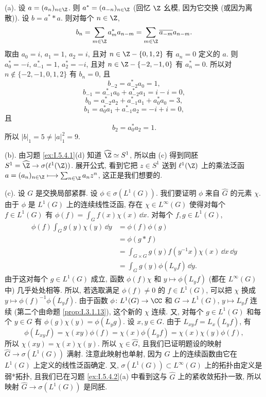 \begin{solution}
(a). 设 $a = (a_n)_{n \in \Z}$. 则 $a^* = (a_{-n})_{n \in \Z}$ (回忆 $\Z$ 幺模, 因为它交换 (或因为离散)). 设 $b = a^* * a$. 则对每个 $n \in \Z$,
\[
b_n = \sum_{m \in \Z}a^*_ma_{n-m} = \sum_{m \in \Z}\overline{a_{-m}}a_{n-m}.
\]
取由 $a_0 = i$, $a_1 = 1$, $a_2 = i$, 且对 $n \in \Z - \{0, 1, 2\}$ 有 $a_n = 0$ 定义的 $a$. 则 $a^*_0 = -i$, $a^*_{-1} = 1$, $a^*_2 = -i$, 且对 $n \in \Z - \{-2, -1, 0\}$ 有 $a^*_n = 0$. 所以对 $n \notin \{-2, -1, 0, 1, 2\}$ 有 $b_n = 0$, 且
\[
b_{-2} = a^*_{-2}a_0 = 1,
\]
\[
b_{-1} = a^*_{-1}a_0 + a^*_{-2}a_1 = i - i = 0,
\]
\[
b_0 = a^*_{-2}a_2 + a^*_{-1}a_1 + a^*_0a_0 = 3,
\]
\[
b_1 = a^*_0a_1 + a^*_{-1}a_2 = -i + i = 0,
\]
且
\[
b_2 = a^*_0a_2 = 1.
\]
所以 $|b|_1 = 5 \neq |a|_1^2 = 9$.

(b). 由习题 \ref{ex:I.5.4.1}(d) 知道 $\widehat{\Z} \simeq S^1$, 所以由 (c) 得到同胚 $S^1 = \widehat{\Z} \to \sigma(\ell^1(\Z))$. 展开公式, 看到它把 $z \in S^1$ 送到 $\ell^1(\Z)$ 上的乘法泛函 $a = (a_n)_{n \in \Z} \longmapsto \sum_{n \in \Z}a_nz^n$, 这正是我们想要的.

(c). 设 $G$ 是交换局部紧群. 设 $\phi \in \sigma(L^1(G))$. 我们要证明 $\phi$ 来自 $\widehat{G}$ 的元素 $\chi$. 由于 $\phi$ 是 $L^1(G)$ 上的连续线性泛函, 存在 $\chi \in L^{\infty}(G)$ 使得对每个 $f \in L^1(G)$ 有 $\phi(f) = \int_G f(x)\chi(x)\,\dd x$.
对每个 $f, g \in L^1(G)$,
\begin{align*}
\phi(f)\int_G g(y)\chi(y)\,\dd y &= \phi(f)\phi(g) \\
&= \phi(g * f) \\
&= \int_{G \times G}g(y)f(y^{-1}x)\chi(x)\,\dd x\,\dd y \\
&= \int_G g(y)\phi(L_yf)\,\dd y.
\end{align*}
由于这对每个 $g \in L^1(G)$ 成立, 函数 $\phi(f)\chi$ 和 $y \longmapsto \phi(L_yf)$ (都在 $L^{\infty}(G)$ 中) 几乎处处相等. 所以, 若选取满足 $\phi(f) \neq 0$ 的 $f \in L^1(G)$, 可以把 $\chi$ 换成 $y \longmapsto \phi(f)^{-1}\phi(L_yf)$. 由于函数 $\phi \colon L^1(G) \to \CC$ 和 $G \to L^1(G)$, $y \longmapsto L_yf$ 连续 (第二个由命题 \ref{prop:I.3.1.13}), 这个新的 $\chi$ 连续. 又, 对每个 $g \in L^1(G)$ 和每个 $y \in G$ 有 $\phi(g)\chi(y) = \phi(L_yg)$.
设 $x, y \in G$. 由于 $L_{xy}f = L_x(L_yf)$, 有
\[
\phi(L_{xy}f) = \chi(xy)\phi(f) = \chi(x)\phi(L_yf) = \chi(x)\chi(y)\phi(f),
\]
所以 $\chi(xy) = \chi(x)\chi(y)$. 所以 $\chi \in \widehat{G}$, 且我们已证明题设的映射 $\widehat{G} \to \sigma(L^1(G))$ 满射. 注意此映射也单射, 因为 $G$ 上的连续函数由它在 $L^1(G)$ 上定义的线性泛函确定. 又, $\sigma(L^1(G)) \subset L^{\infty}(G)$ 上的拓扑由定义是弱*拓扑, 且我们已在习题 \ref{ex:I.5.4.2}(a) 中看到这与 $\widehat{G}$ 上的紧收敛拓扑一致, 所以映射 $\widehat{G} \to \sigma(L^1(G))$ 是同胚.
\end{solution}

